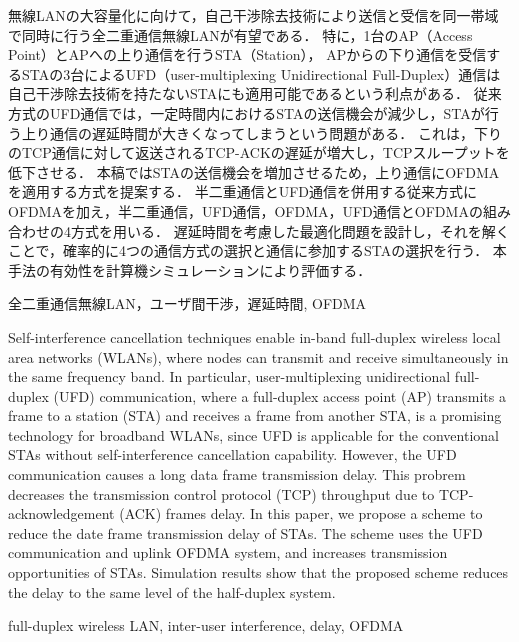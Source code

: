 \documentclass[technicalreport]{ieicej}
\begin{document}
\begin{jabstract}
	無線LANの大容量化に向けて，自己干渉除去技術により送信と受信を同一帯域で同時に行う全二重通信無線LANが有望である．
	特に，1台のAP（Access Point）とAPへの上り通信を行うSTA（Station），
	APからの下り通信を受信するSTAの3台によるUFD（user-multiplexing Unidirectional Full-Duplex）通信は自己干渉除去技術を持たないSTAにも適用可能であるという利点がある．
	従来方式のUFD通信では，一定時間内におけるSTAの送信機会が減少し，STAが行う上り通信の遅延時間が大きくなってしまうという問題がある．
	これは，下りのTCP通信に対して返送されるTCP-ACKの遅延が増大し，TCPスループットを低下させる．
	本稿ではSTAの送信機会を増加させるため，上り通信にOFDMAを適用する方式を提案する．
	半二重通信とUFD通信を併用する従来方式にOFDMAを加え，半二重通信，UFD通信，OFDMA，UFD通信とOFDMAの組み合わせの4方式を用いる．
	遅延時間を考慮した最適化問題を設計し，それを解くことで，確率的に4つの通信方式の選択と通信に参加するSTAの選択を行う．
	本手法の有効性を計算機シミュレーションにより評価する．
\end{jabstract}
\begin{jkeyword}
	全二重通信無線LAN，ユーザ間干渉，遅延時間, OFDMA
\end{jkeyword}
\begin{eabstract}
	Self-interference cancellation techniques enable in-band full-duplex wireless local area networks (WLANs), where nodes can  transmit and receive simultaneously in the same frequency band.
	In particular, user-multiplexing unidirectional full-duplex (UFD) communication, where a full-duplex access point (AP) transmits a frame to a station (STA) and receives a frame from another STA, is a promising technology for broadband WLANs, since UFD is applicable for the conventional STAs without self-interference cancellation capability.
	However, the UFD communication causes a long data frame transmission delay.
	This probrem decreases the transmission control protocol (TCP) throughput due to TCP-acknowledgement (ACK) frames delay.
	In this paper, we propose a scheme to reduce the date frame transmission delay of STAs.
	The scheme uses the UFD communication and uplink OFDMA system, and increases transmission opportunities of STAs.
	Simulation results show that the proposed scheme reduces the delay to the same level of the half-duplex system.

\end{eabstract}
\begin{ekeyword}
	full-duplex wireless LAN, inter-user interference, delay, OFDMA
\end{ekeyword}
\end{document}
